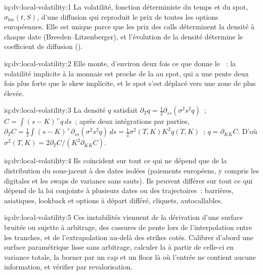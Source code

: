 \begin{solution}{iq:dv:local-volatility:1}
La volatilité, fonction déterministe du temps et du spot, $\sigma_{\mathrm{loc}}(t,S)$, d'une diffusion qui
reproduit le prix de toutes les options européennes. Elle est unique parce que les prix des calls déterminent la densité à chaque date
(Breeden--Litzenberger), et l'évolution de la densité détermine le coefficient de diffusion ().
\end{solution}

\begin{solution}{iq:dv:local-volatility:2}
Elle monte, d'environ deux fois ce que donne le ~: la volatilité implicite à la monnaie est proche de la
 au spot, qui a une pente deux fois plus forte que le skew implicite, et le spot s'est déplacé vers une zone de
 plus élevée.
\end{solution}

\begin{solution}{iq:dv:local-volatility:3}
La densité $q$ satisfait $\partial_Tq=\tfrac12\partial_{ss}(\sigma^2s^2q)$~; $C=\int(s-K)^+q\,ds$~; après deux intégrations par parties, $\partial_TC=
\tfrac12\int(s-K)^+\partial_{ss}(\sigma^2s^2q)\,ds=\tfrac12\sigma^2(T,K)K^2q(T,K)$~;
$q=\partial_{KK}C$. D'où $\sigma^2(T,K)=2\partial_TC/(K^2\partial_{KK}C)$.
\end{solution}

\begin{solution}{iq:dv:local-volatility:4}
Ils coïncident sur tout ce qui ne dépend que de la distribution du sous-jacent à des dates isolées (paiements européens,
y compris les digitales et les swaps de variance sans sauts). Ils peuvent différer sur tout ce qui dépend de la loi conjointe à
plusieurs dates ou des trajectoires~: barrières, asiatiques, lookback et options à départ différé, cliquets, autocallables.
\end{solution}

\begin{solution}{iq:dv:local-volatility:5}
Ces instabilités viennent de la dérivation d'une surface bruitée ou sujette à arbitrage, des cassures de pente lors de l'interpolation entre les tranches, et de
l'extrapolation au-delà des strikes cotés. Calibrer d'abord une surface paramétrique lisse sans arbitrage, calculer la
 à partir de celle-ci en variance totale, la borner par un cap et un floor là où l'entrée ne contient aucune information, et vérifier par revalorisation.
\end{solution}

